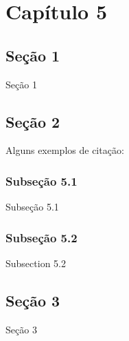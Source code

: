 \chapter{Capítulo 5}

\section{Seção 1}

Seção 1


\section{Seção 2}

Alguns exemplos de citação: 



\subsection{Subseção 5.1}

Subseção 5.1


\subsection{Subseção 5.2}

Subsection 5.2


\section{Seção 3}

Seção 3